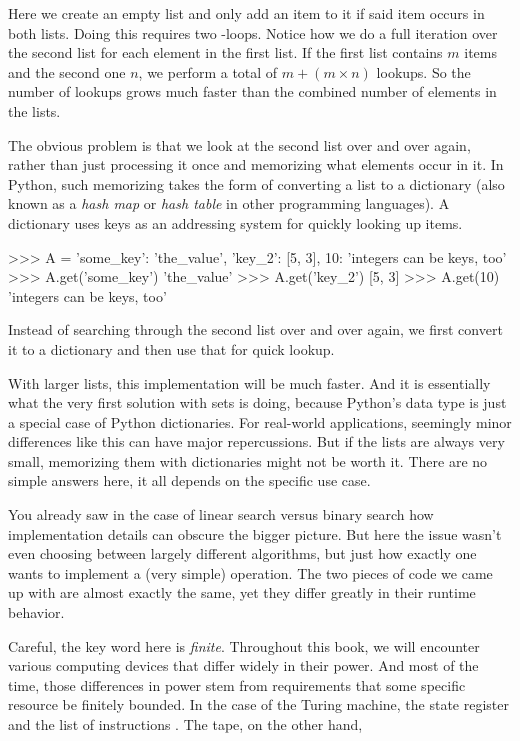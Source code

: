 \begin{programming}
Here we create an empty list and only add an item to it if said item occurs in both lists.
Doing this requires two -loops.
Notice how we do a full iteration over the second list for each element in the first list.
If the first list contains $m$ items and the second one $n$, we perform a total of $m + (m \times n)$ lookups.
So the number of lookups grows much faster than the combined number of elements in the lists.

The obvious problem is that we look at the second list over and over again, rather than just processing it once and memorizing what elements occur in it.
In Python, such memorizing takes the form of converting a list to a dictionary (also known as a \emph{hash map} or \emph{hash table} in other programming languages).
A dictionary uses keys as an addressing system for quickly looking up items.
%
\begin{center}
    \begin{pythoncode}
    >>> A = {'some_key': 'the_value',
             'key_2': [5, 3],
             10: 'integers can be keys, too'}
    >>> A.get('some_key')
    'the_value'
    >>> A.get('key_2')
    [5, 3]
    >>> A.get(10)
    'integers can be keys, too'
    \end{pythoncode}
\end{center}
%
Instead of searching through the second list over and over again, we first convert it to a dictionary and then use that for quick lookup.

\begin{center}
\end{center}

With larger lists, this implementation will be much faster.
And it is essentially what the very first solution with sets is doing, because Python's  data type is just a special case of Python dictionaries.
For real-world applications, seemingly minor differences like this can have major repercussions.
But if the lists are always very small, memorizing them with dictionaries might not be worth it.
There are no simple answers here, it all depends on the specific use case.

You already saw in the case of linear search versus binary search how implementation details can obscure the bigger picture.
But here the issue wasn't even choosing between largely different algorithms, but just how exactly one wants to implement a (very simple) operation.
The two pieces of code we came up with are almost exactly the same, yet they differ greatly in their runtime behavior.



Careful, the key word here is \emph{finite}.
Throughout this book, we will encounter various computing devices that differ widely in their power.
And most of the time, those differences in power stem from requirements that some specific resource be finitely bounded.
In the case of the Turing machine, the state register and the list of instructions .
The tape, on the other hand,
\end{programming}

